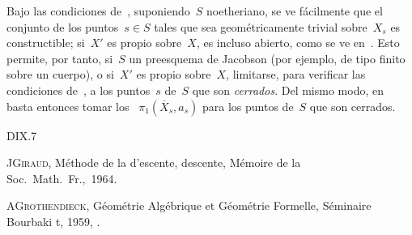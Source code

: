 \begin{remarque}
\label{IX.6.12}
Bajo las condiciones de~, suponiendo~$S$ noetheriano, se ve
fácilmente que el conjunto de los puntos~$s\in S$ tales que
sea geométricamente trivial sobre~$X_s$ es constructible; si~$X'$ es propio
sobre~$X$, es incluso abierto, como se ve en~. Esto permite, por
tanto, si~$S$
un preesquema de Jacobson (por ejemplo, de tipo finito sobre un cuerpo), o
si~$X'$ es propio sobre~$X$, limitarse, para verificar las condiciones
de~, a los puntos~$s$ de~$S$ que son \emph{cerrados}. Del mismo
modo, en~ basta entonces tomar los
~$\pi_1(\overline X_s,a_s)$ para los puntos de~$S$ que son cerrados.
\end{remarque}

\begin{sgabibliography}{D}{IX.7}

 J\ptbl \textsc{Giraud}, Méthode de la
{d'escente,}
{descente,}
Mémoire  de la Soc.\ Math.\ Fr.,~1964.

 A\ptbl \textsc{Grothendieck}, Géométrie Algébrique et
Géométrie Formelle, Séminaire Bourbaki t, 1959, .
\end{sgabibliography}
